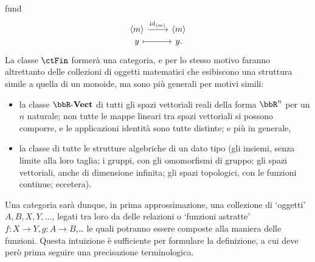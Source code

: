 \begin{hExample}{fund}
\[\begin{tikzcd}[row sep=0]
			{\bkt{m}} \ar{r}{\id_{\bkt{m}}} & {\bkt{m}} \\
			y \ar[mapsto]{r} & y .
		\end{tikzcd}
	\]
	La classe \(\ctFin\) formerà una categoria, e per lo stesso motivo faranno altrettanto delle collezioni di oggetti matematici che esibiscono una struttura simile a quella di un monoide, ma sono più generali per motivi simili:
	\begin{itemize}
		\item {} la classe \(\ctVect[\bbR]\) di tutti gli spazi vettoriali reali della forma \(\bbR^n\) per un \(n\) naturale; non tutte le mappe lineari tra spazi vettoriali si possono comporre, e le applicazioni identità sono tutte distinte; e più in generale,
		\item la classe di tutte le strutture algebriche di un dato tipo (gli insiemi, senza limite alla loro taglia; i gruppi, con gli omomorfismi di gruppo; gli spazi vettoriali, anche di dimensione infinita; gli spazi topologici, con le funzioni continue; eccetera).
	\end{itemize}
\end{hExample}
Una categoria sarà dunque, in prima approssimazione, una collezione di `oggetti' \(A,B,X,Y,\dots\), legati tra loro da delle relazioni o `funzioni astratte' \(f : X\to Y, g : A\to B\),\dots{} le quali potranno essere composte alla maniera delle funzioni. Questa intuizione è sufficiente per formulare la definizione, a cui deve però prima seguire una precisazione terminologica.
